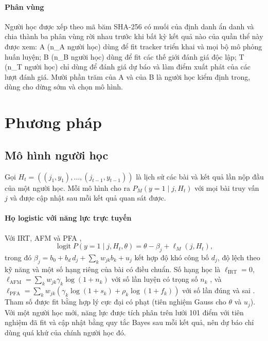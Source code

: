 \paragraph{Phân vùng} Người học được xếp theo mã băm SHA-256 có muối của định danh ẩn danh và chia thành ba phân vùng rời nhau trước khi bất kỳ kết quả nào của quần thể này được xem: A ({{n_A}} người học) dùng để fit tracker triển khai và mọi bộ mô phỏng huấn luyện; B ({{n_B}} người học) dùng để fit các thế giới đánh giá độc lập; T ({{n_T}} người học) chỉ dùng để đánh giá dự báo và làm điểm xuất phát của các lượt đánh giá. Mười phần trăm của A và của B là người học kiểm định trong, dùng cho dừng sớm và chọn mô hình.

\section{Phương pháp}\label{sec:methods}

\subsection{Mô hình người học}\label{sec:learners}

Gọi $H_t=((j_1,y_1),\dots,(j_{t-1},y_{t-1}))$ là lịch sử các bài và kết quả lần nộp đầu của một người học. Mỗi mô hình cho ra $P_M(y=1\mid j,H_t)$ với mọi bài truy vấn $j$ và được cập nhật sau mỗi kết quả quan sát được.

\paragraph{Họ logistic với năng lực trực tuyến} Với IRT, AFM và PFA \citep[xem tổng quan về họ mô hình này ở][]{pelanek2017learner},
\begin{equation}
\operatorname{logit} P(y=1\mid j,H_t,\theta) = \theta - \beta_j + \ell_M(j,H_t),
\label{eq:logistic}
\end{equation}
trong đó $\beta_j = b_0 + b_d\,d_j + \sum_k w_{jk} b_k + u_j$ kết hợp độ khó công bố $d_j$, độ lệch theo kỹ năng và một số hạng riêng của bài có điều chuẩn. Số hạng học là $\ell_{\mathrm{IRT}}=0$, $\ell_{\mathrm{AFM}}=\sum_k w_{jk}\gamma_k\log(1+n_k)$ với số lần luyện có trọng số $n_k$ \citep{cen2006lfa}, và $\ell_{\mathrm{PFA}}=\sum_k w_{jk}(\gamma_k\log(1+s_k)+\rho_k\log(1+f_k))$ với số lần đúng và sai \citep{pavlik2009pfa}. Tham số được fit bằng hợp lý cực đại có phạt (tiên nghiệm Gauss cho $\theta$ và $u_j$). Với một người học mới, năng lực được tích phân trên lưới 101 điểm với tiên nghiệm đã fit và cập nhật bằng quy tắc Bayes sau mỗi kết quả, nên dự báo chỉ dùng quá khứ của chính người học đó.

